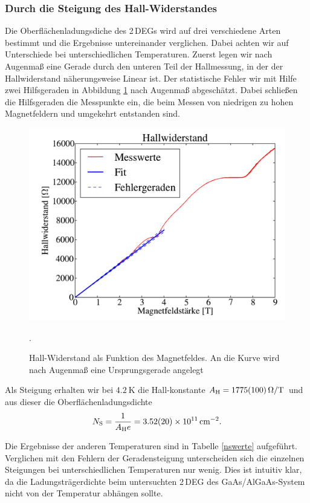 \documentclass[paper=a4,fontsize=10pt,DIV=18,twocolumn,parskip=half]{scrartcl}
\numberwithin{equation}{section}    %
\begin{document}
\subsubsection*{Durch die Steigung des Hall-Widerstandes}
Die Oberflächenladungsdiche des 2\,DEGs wird auf drei verschiedene Arten bestimmt und die Ergebnisse untereinander verglichen. Dabei achten wir auf Unterschiede bei unterschiedlichen Temperaturen. Zuerst legen wir nach Augenmaß eine Gerade durch den unteren Teil der Hallmessung, in der der Hallwiderstand näherungsweise Linear ist. Der statistische Fehler wir mit Hilfe zwei Hilfsgeraden in Abbildung \ref{hallsteigung} nach Augenmaß abgeschätzt. Dabei schließen die Hilfsgeraden die Messpunkte ein, die beim Messen von niedrigen zu hohen Magnetfeldern und umgekehrt entstanden sind. 
\begin{figure}[htp]
	\begin{center}
		\includegraphics[width=\columnwidth]{Data-Plots/02-Hallsteigung.pdf}
		\caption{Hall-Widerstand als Funktion des Magnetfeldes. An die Kurve wird nach Augenmaß eine Ursprungsgerade angelegt}.
		\label{hallsteigung}
	\end{center}
\end{figure}
Als Steigung erhalten wir bei $\SI{4.2}{\kelvin}$ die Hall-konstante $A_{\rm H}=\SI[per-mode=symbol]{1775(100)}{\ohm\per\tesla}$ und aus dieser die Oberflächenladungsdichte
\begin{equation}
N_{\rm S}=\frac{1}{A_{\rm H} e} = \SI{3.52(20)e11}{\per\square\centi\meter}.
\label{ns1}
\end{equation}

Die Ergebnisse der anderen Temperaturen sind in Tabelle \ref{nswerte} aufgeführt.
Verglichen mit den Fehlern der Geradensteigung unterscheiden sich die einzelnen Steigungen bei unterschiedlichen Temperaturen nur wenig. Dies ist intuitiv klar, da die Ladungsträgerdichte beim untersuchten 2\,DEG des GaAs/AlGaAs-System nicht von der Temperatur abhängen sollte.
\end{document}
